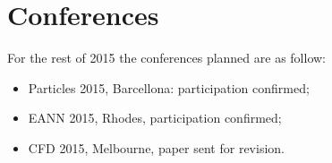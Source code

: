 
\section{Conferences}
\label{sec:cfdconference}

For the rest of 2015 the conferences planned are as follow:
\begin{itemize}
\item{Particles 2015, Barcellona: participation confirmed;}
\item{EANN 2015, Rhodes, participation confirmed;}
\item{CFD 2015, Melbourne, paper sent for revision.}
\end{itemize}
